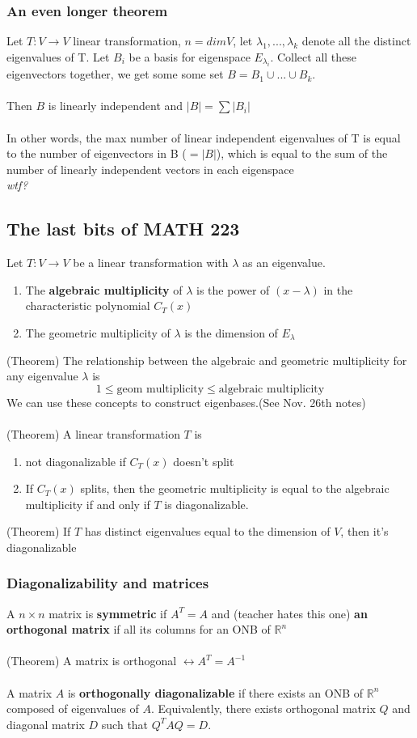 \documentclass{article}
\begin{document}
\subsubsection{An even longer theorem}
Let $T:V\rightarrow V$ linear transformation, $n=dimV$, let $\lambda_1,...,\lambda_k$ denote all the distinct eigenvalues of T. Let $B_i$ be a basis for eigenspace $E_{\lambda_i}$. Collect all these eigenvectors together, we get some some set $B=B_1\cup...\cup B_k$.\\\\
Then $B$ is linearly independent and $|B|=\sum|B_i|$
\\\\
In other words, the max number of linear independent eigenvalues of T is equal to the number of eigenvectors in B ($=|B|$), which is equal to the sum of the number of linearly independent vectors in each eigenspace
\\
\textit{wtf?}

\subsection{The last bits of MATH 223}
Let $T:V\rightarrow V$ be a linear transformation with $\lambda$ as an eigenvalue.
\begin{enumerate}
    \item The \textbf{algebraic multiplicity} of $\lambda$ is the power of $(x-\lambda)$ in the characteristic polynomial $C_T(x)$
    \item The geometric multiplicity of $\lambda$ is the dimension of $E_\lambda$
\end{enumerate}
(Theorem) The relationship between the algebraic and geometric multiplicity for any eigenvalue $\lambda$ is 
\[1\leq \text{geom multiplicity} \leq \text{algebraic multiplicity}\]
We can use these concepts to construct eigenbases.(See Nov. 26th notes)\\\\
(Theorem) A linear transformation $T$ is
\begin{enumerate}
    \item not diagonalizable if $C_T(x)$ doesn't split
    \item If $C_T(x)$ splits, then the geometric multiplicity is equal to the algebraic multiplicity if and only if $T$ is diagonalizable.
\end{enumerate}
(Theorem) If $T$ has distinct eigenvalues equal to the dimension of $V$, then it's diagonalizable %
\subsubsection{Diagonalizability and matrices}
A $n\times n$ matrix is \textbf{symmetric} if $A^T=A$ and (teacher hates this one) \textbf{an orthogonal matrix} if all its columns for an ONB of $\mathds{R}^n$ \\\\
(Theorem) A matrix is orthogonal $\leftrightarrow A^T=A^{-1}$
\\\\A matrix $A$ is \textbf{orthogonally diagonalizable} if there exists an ONB of $\mathds{R}^n$ composed of eigenvalues of $A$. Equivalently, there exists orthogonal matrix $Q$ and diagonal matrix $D$ such that $Q^TAQ=D$.
\end{document}
